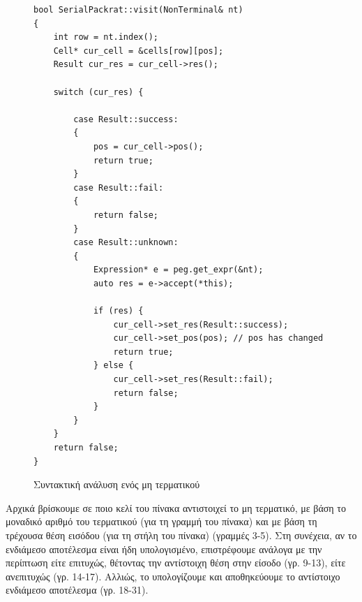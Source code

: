 \begin{figure}[h]
\setlength\partopsep{-\topsep}%
\begin{verbatim}
bool SerialPackrat::visit(NonTerminal& nt)
{
    int row = nt.index();
    Cell* cur_cell = &cells[row][pos];
    Result cur_res = cur_cell->res();

    switch (cur_res) {

        case Result::success:
        {
            pos = cur_cell->pos();
            return true;
        }
        case Result::fail:
        {
            return false;
        }
        case Result::unknown:
        {
            Expression* e = peg.get_expr(&nt);
            auto res = e->accept(*this);

            if (res) {
                cur_cell->set_res(Result::success);
                cur_cell->set_pos(pos); // pos has changed
                return true;
            } else {
                cur_cell->set_res(Result::fail);
                return false;
            }
        }
    }
    return false;
}
\end{verbatim}
  \caption{Συντακτική ανάλυση ενός μη τερματικού}
  \label{fig:visit_nt}
\end{figure}

Αρχικά βρίσκουμε σε ποιο κελί του πίνακα αντιστοιχεί το μη τερματικό, με βάση το μοναδικό αριθμό του τερματικού (για τη γραμμή του πίνακα) και με βάση τη τρέχουσα θέση εισόδου (για τη στήλη του πίνακα) (γραμμές 3-5).
Στη συνέχεια, αν το ενδιάμεσο αποτέλεσμα είναι ήδη υπολογισμένο, επιστρέφουμε ανάλογα με την περίπτωση είτε επιτυχώς, θέτοντας την αντίστοιχη θέση στην είσοδο (γρ. 9-13), είτε ανεπιτυχώς (γρ. 14-17).
Αλλιώς, το υπολογίζουμε και αποθηκεύουμε το αντίστοιχο ενδιάμεσο αποτέλεσμα (γρ. 18-31).
